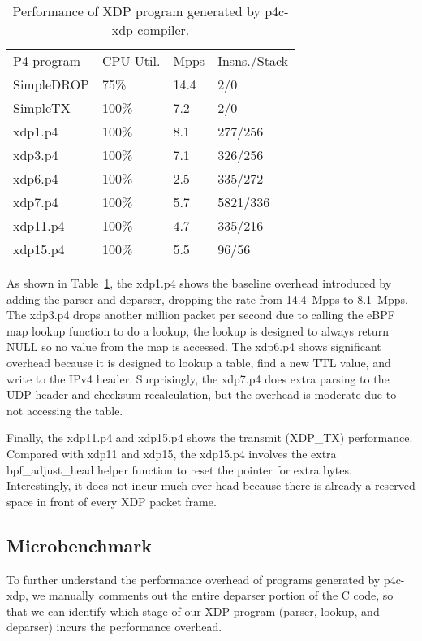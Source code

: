 \begin{table}
\centering
\small
\begin{tabular}{llll}
  \underline{P4 program} & \underline{CPU Util.} & \underline{Mpps} & \underline{Insns./Stack}\\
  SimpleDROP & 75\% & 14.4 & 2/0 \\
  SimpleTX & 100\% & 7.2 & 2/0 \\
  xdp1.p4 &  100\% &  8.1 & 277/256 \\
  xdp3.p4 &  100\% &  7.1 & 326/256 \\
  xdp6.p4 &  100\% &  2.5 & 335/272 \\
  xdp7.p4 &  100\% &  5.7 & 5821/336 \\
  xdp11.p4 &  100\% &  4.7  & 335/216 \\
  xdp15.p4 &  100\% &  5.5 & 96/56\\
\end{tabular}
\caption{\footnotesize Performance of XDP program generated by
  p4c-xdp compiler.}
\label{tab:perf}
\end{table}

As shown in Table~\ref{tab:perf}, the xdp1.p4 shows the baseline overhead
introduced by adding the parser and deparser, dropping the rate from 14.4~Mpps to
8.1~Mpps. The xdp3.p4 drops another million packet per second due to
calling the eBPF map lookup function to do a lookup, the lookup is designed
to always return NULL so no value from the map is accessed.
The xdp6.p4 shows significant overhead because it is designed to lookup
a table, find a new TTL value, and write to the IPv4 header. 
Surprisingly, the xdp7.p4 does extra parsing to the UDP header and
checksum recalculation, but the overhead is moderate due to not accessing
the table.

Finally, the xdp11.p4 and xdp15.p4 shows the transmit (XDP\_TX) performance.
Compared with xdp11 and xdp15, the xdp15.p4 involves the extra bpf\_adjust\_head helper
function to reset the pointer for extra bytes.  
Interestingly, it does not incur much over head because there is
already a reserved space in front of every XDP packet frame.

\subsection{Microbenchmark}
To further understand the performance overhead of programs generated by p4c-xdp,
we manually {\emph comments out} the entire deparser portion of the C code, so that
we can identify which stage of our XDP program (parser, lookup, and deparser) incurs
the performance overhead.

